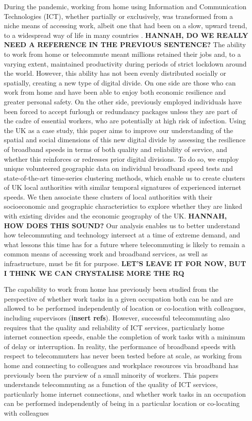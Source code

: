 \documentclass[]{interact}
\theoremstyle{plain}%
\theoremstyle{definition}
\theoremstyle{remark}
\begin{document}
During the pandemic, working from home using Information and
Communication Technologies (ICT), whether partially or exclusively, was
transformed from a niche means of accessing work, albeit one that had
been on a slow, upward trend, to a widespread way of life in many
countries \citep{felstead2020homeworking}. \textbf{HANNAH, DO WE REALLY
NEED A REFERENCE IN THE PREVIOUS SENTENCE?} The ability to work from
home or telecommute meant millions retained their jobs and, to a varying
extent, maintained productivity during periods of strict lockdown around
the world. However, this ability has not been evenly distributed
socially or spatially, creating a new type of digital divide. On one
side are those who can work from home and have been able to enjoy both
economic resilience and greater personal safety. On the other side,
previously employed individuals have been forced to accept furlough or
redundancy packages unless they are part of the cadre of essential
workers, who are potentially at high risk of infection. Using the UK as
a case study, this paper aims to improve our understanding of the
spatial and social dimensions of this new digital divide by assessing
the resilience of broadband speeds in terms of both quality and
reliability of service, and whether this reinforces or redresses prior
digital divisions. To do so, we employ unique volunteered geographic
data on individual broadband speed tests and state-of-the-art
time-series clustering methods, which enable us to create clusters of UK
local authorities with similar temporal signatures of experienced
internet speeds. We then associate these clusters of local authorities
with their socioeconomic and geographic characteristics to explore
whether they are linked with existing divides and the economic geography
of the UK. \textbf{HANNAH, HOW DOES THIS SOUND?} Our analysis enables us
to better understand how telecommuting and technology intersect at a
time of extreme demand, and what lessons this time has for a future
where telecommuting is likely to remain a common means of accessing work
and broadband services, as well as infrastructure, must be fit for
purpose. \textbf{LET'S LEAVE IT FOR NOW, BUT I THINK WE CAN CRYSTALISE
MORE THE RQ}

The capability to work from home has previously been studied from the
perspective of whether work tasks in a given occupation both can be and
are allowed to be performed independently of location or co-location
with colleagues, including supervisors (\textbf{insert refs}). However,
successful telecommuting also requires that the quality and reliability
of ICT services, particularly home internet connection speeds, enable
the completion of work tasks with a minimum of delay or interruption. In
reality, the performance of broadband speeds with respect to
telecommuters has never been tested before at scale, as working from
home and connecting to colleagues and workplace resources via broadband
has previously been the purview of a small minority of workers. This
papers understands telecommuting as a function of the quality of ICT
services, particularly home internet connections, and whether work tasks
in an occupation can be performed independently of being in a particular
location or co-locating with colleagues
\end{document}
